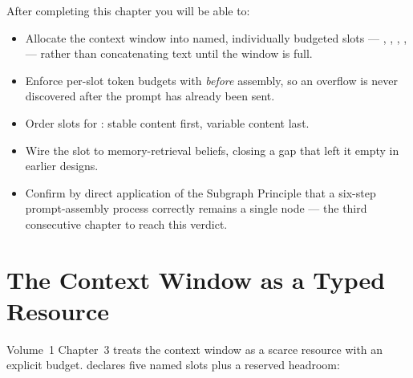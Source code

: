 

\begin{learningbox}
After completing this chapter you will be able to:
\begin{itemize}
  \item Allocate the context window into named, individually budgeted
        slots --- , , ,
        ,  --- rather than concatenating
        text until the window is full.
  \item Enforce per-slot token budgets with 
        \emph{before} assembly, so an overflow is never discovered after
        the prompt has already been sent.
  \item Order slots for : stable content first,
        variable content last.
  \item Wire the  slot to memory-retrieval beliefs,
        closing a gap that left it empty in earlier designs.
  \item Confirm by direct application of the Subgraph Principle that a
        six-step prompt-assembly process correctly remains a single node
        --- the third consecutive chapter to reach this verdict.
\end{itemize}
\end{learningbox}

\section{The Context Window as a Typed Resource}
\label{sec:context-resource}

Volume~1 Chapter~3 treats the context window as a scarce resource with an
explicit budget.   declares five named slots plus a
reserved headroom:

